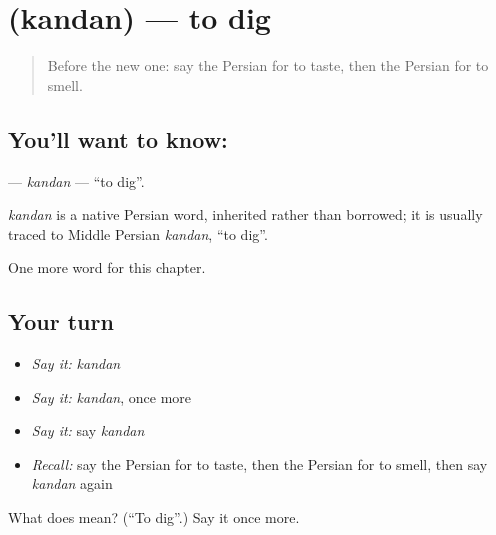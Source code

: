 \section[\texorpdfstring{\fa{کندن} (kandan)}{کندن (kandan)}]{ (kandan) — to dig}

\label{lesson:FA-C134-kandan}



\begin{quote}
Before the new one: say the Persian for to taste, then the Persian for to smell.
\end{quote}

\subsection*{You'll want to know: }
\textbf{} — \emph{kandan} — \textquotedblleft{}to dig\textquotedblright{}.

\begin{cousinweb}
\emph{kandan} is a native Persian word, inherited rather than borrowed; it is usually traced to Middle Persian \emph{kandan}, \textquotedblleft{}to dig\textquotedblright{}.
\end{cousinweb}

\begin{grammarlens}[title={What you've built}]
One more word for this chapter.
\end{grammarlens}

\subsection*{Your turn}
\begin{itemize}
\raggedright
  \item \emph{Say it:} \emph{kandan}
  \item \emph{Say it:} \emph{kandan}, once more
  \item \emph{Say it:} say \emph{kandan}
  \item \emph{Recall:} say the Persian for to taste, then the Persian for to smell, then say \emph{kandan} again
\end{itemize}

\begin{tcolorbox}[breakable,colback=teal!4,colframe=teal!35!black,title={Before you move on}]
What does  mean? (\textquotedblleft{}To dig\textquotedblright{}.) Say it once more.
\end{tcolorbox}
